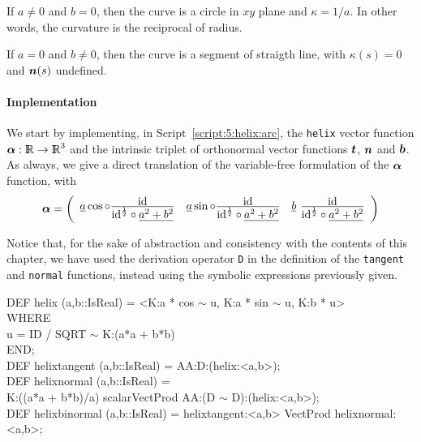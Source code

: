 \documentclass{31x47jw}
\begin{document}
If $a\not=0$ and $b=0$, then the curve is a circle in $xy$ plane and
$\kappa=1/a$. In other words, the curvature is the reciprocal of 
radius.

If $a=0$ and $b\not=0$, then the curve is a segment of straigth line,
with $\kappa(s)=0$ and ${\mbox{\boldmath $n$}}(s)$ undefined.



\paragraph{Implementation}

We start by implementing, in Script~\ref{script:5:helix:arc}, the
\texttt{helix} vector function ${\mbox{\boldmath $\alpha$}}:\mathbb{I\!\!R}\rightarrow\mathbb{I\!\!R}^{3}$ and the
intrinsic triplet of orthonormal vector functions ${\mbox{\boldmath $t$}}$, ${\mbox{\boldmath $n$}}$ and
${\mbox{\boldmath $b$}}$. As always, we give a direct translation of the variable-free 
formulation of the ${\mbox{\boldmath $\alpha$}}$ function, with
\[
{\mbox{\boldmath $\alpha$}} = {\left(\begin{array}{cccccccc} 
\underline{a} \cos \circ {\mbox{id} \over { \mbox{id}^{1\over 2}
\textstyle\circ 
\underline{{a}^{2}+{b}^{2}}}} & 
\underline{a} \sin \circ {\mbox{id} \over { \mbox{id}^{1\over 2}
\textstyle\circ 
\underline{{a}^{2}+{b}^{2}}}} & 
\underline{b} \ {\mbox{id} \over { \mbox{id}^{1\over 2}
\textstyle\circ 
\underline{{a}^{2}+{b}^{2}}}} \end{array}\right)}
\]

Notice that, for the sake of abstraction and consistency with the contents
of this chapter, we have used the derivation operator \texttt{D} in
the definition of the \texttt{tangent} and \texttt{normal} functions,
instead using the symbolic expressions previously given.

\begin{script}
\begin{smallplasm}
DEF helix (a,b::IsReal) = <K:a * cos $\sim$ u, K:a * sin $\sim$ u, K:b * u>\\
WHERE \+\\
  u = ID / SQRT $\sim$ K:(a*a + b*b)\-\\
END;\\[0.3cm]

DEF helixtangent (a,b::IsReal) = AA:D:(helix:<a,b>);\\
DEF helixnormal (a,b::IsReal) = \+\\
    K:((a*a + b*b)/a) scalarVectProd AA:(D $\sim$ D):(helix:<a,b>);\-\\
DEF helixbinormal (a,b::IsReal) = helixtangent:<a,b> VectProd helixnormal:<a,b>;
\end{smallplasm}
\label{script:5:helix:arc}
\end{script}
\end{document}
